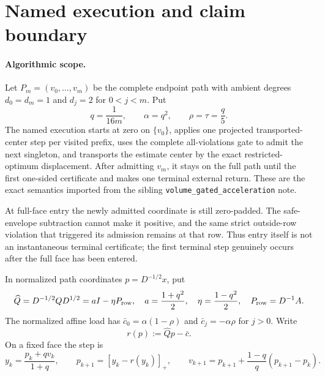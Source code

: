\section{Named execution and claim boundary}
\label{sec:terminal-modal-scope}

\paragraph{Algorithmic scope.}
Let $P_m=(v_0,\ldots,v_m)$ be the complete endpoint path with ambient degrees
$d_0=d_m=1$ and $d_j=2$ for $0<j<m$.  Put
\begin{equation}
 q=\frac1{16m},\qquad \alpha=q^2,\qquad \rho=\tau=\frac q5.
 \label{eq:terminal-modal-parameters}
\end{equation}
The named execution starts at zero on $\{v_0\}$, applies one projected
transported-center step per visited prefix, uses the complete all-violations
gate to admit the next singleton, and transports the estimate center by the
exact restricted-optimum displacement.  After admitting $v_m$, it stays on
the full path until the first one-sided certificate and makes one terminal
external return.  These are the exact semantics imported from the sibling
\texttt{volume\_gated\_acceleration} note.

At full-face entry the newly admitted coordinate is still zero-padded.  The
safe-envelope subtraction cannot make it positive, and the same strict
outside-row violation that triggered its admission remains at that row.
Thus entry itself is not an instantaneous terminal certificate; the first
terminal step genuinely occurs after the full face has been entered.

In normalized path coordinates $p=D^{-1/2}x$, put
\begin{equation}
 \widehat Q=D^{-1/2}QD^{1/2}
 =aI-\eta P_{\rm row},
 \quad
 a=\frac{1+q^2}{2},\quad
 \eta=\frac{1-q^2}{2},\quad
 P_{\rm row}=D^{-1}A.
 \label{eq:terminal-modal-operator}
\end{equation}
The normalized affine load has
$\bar c_0=\alpha(1-\rho)$ and
$\bar c_j=-\alpha\rho$ for $j>0$.  Write
\begin{equation}
 r(p):=\widehat Qp-\bar c.
 \label{eq:terminal-modal-residual}
\end{equation}
On a fixed face the step is
\begin{equation}
 y_k=\frac{p_k+qv_k}{1+q},\qquad
 p_{k+1}=\left[y_k-r(y_k)\right]_+,\qquad
 v_{k+1}=p_{k+1}+\frac{1-q}{q}(p_{k+1}-p_k).
 \label{eq:terminal-modal-step}
\end{equation}

